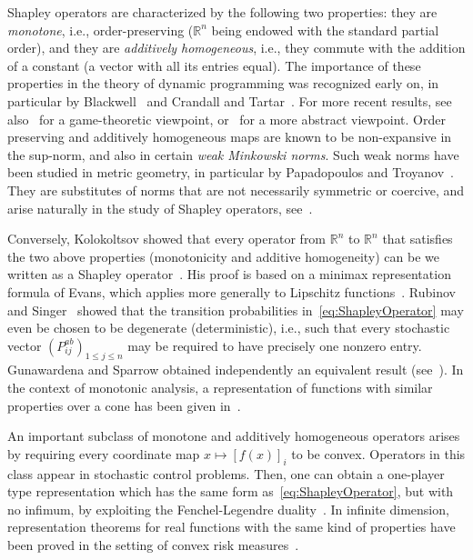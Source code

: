 \documentclass[a4paper,11pt]{amsart}
\theoremstyle{definition}
\theoremstyle{remark}
\begin{document}
Shapley operators are characterized by the following two properties:
they are {\em monotone}, i.e., order-preserving (${\mathbb{R}}^n$ being endowed with the standard partial order),
and they are {\em additively homogeneous}, i.e., they commute with the addition of a constant
(a vector with all its entries equal).
The importance of these properties in the theory of dynamic programming was recognized early on,
in particular by Blackwell~\cite{Bla65} and Crandall and Tartar~\cite{CT80}.
For more recent results, see also~\cite{RS01a,Sor04} for a game-theoretic viewpoint,
or~\cite{MLRS02} for a more abstract viewpoint. 
Order preserving and additively homogeneous maps are known to be non-expansive in the sup-norm,
and also in certain {\em weak Minkowski norms}.
Such weak norms have been studied in metric geometry, in particular by Papadopoulos and Troyanov~\cite{PT14}.
They are substitutes of norms that are not necessarily symmetric or coercive,
and arise naturally in the study of Shapley operators, see~\cite{GV12}. 

Conversely, Kolokoltsov showed that every operator from ${\mathbb{R}}^n$ to ${\mathbb{R}}^n$
that satisfies the two above properties (monotonicity and additive homogeneity)
can be we written as a Shapley operator~\cite{Kol92}.
His proof is based on a minimax representation formula of Evans,
which applies more generally to Lipschitz functions~\cite{Eva84}.
Rubinov and Singer~\cite{RS01b} showed that the transition probabilities in~\eqref{eq:ShapleyOperator}
may even be chosen to be degenerate (deterministic), i.e., such that every stochastic vector
$(P_{i j}^{a b})_{1 {\leqslant} j {\leqslant} n}$ may be required to have precisely one nonzero entry.  
Gunawardena and Sparrow obtained independently an equivalent result (see~\cite[Prop.~2.3]{Gun03}).
In the context of monotonic analysis, a representation of functions
with similar properties over a cone has been given in~\cite{DMLR08}.

An important subclass of monotone and additively homogeneous operators arises
by requiring every coordinate map $x\mapsto [f(x)]_i$ to be convex.
Operators in this class appear in stochastic control problems.
Then, one can obtain a one-player type representation which has the same form as~\eqref{eq:ShapleyOperator},
but with no infimum, by exploiting the Fenchel-Legendre duality~\cite{AG03}.
In infinite dimension, representation theorems for real functions with the same kind of properties
have been proved in the setting of convex risk measures~\cite{FS02,FRG02}.
\end{document}
